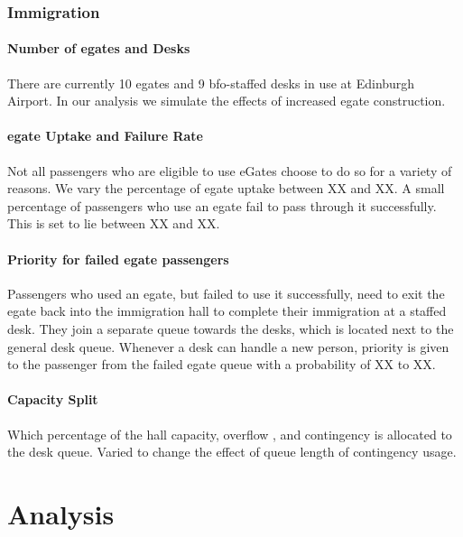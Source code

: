 \documentclass[10pt]{article}
\begin{document}
\subsubsection{Immigration}

\paragraph{Number of \glspl{egate} and Desks} There are currently 10 \glspl{egate} and 9 \gls{bfo}-staffed desks in use at Edinburgh Airport. In our analysis we simulate the effects of increased \gls{egate} construction.

\paragraph{\gls{egate} Uptake and Failure Rate} 
Not all passengers who are eligible to use eGates choose to do so for a variety of reasons. We vary the percentage of \gls{egate} uptake between XX and XX.  A small percentage of passengers who use an \gls{egate} fail to pass through it successfully. This is set to lie between XX and XX. 

\paragraph{Priority for failed \gls{egate} passengers}
Passengers who used an \gls{egate}, but failed to use it successfully, need to exit the \gls{egate} back into the immigration hall to complete their immigration at a staffed desk. They join a separate queue towards the desks, which is located next to the general desk queue. Whenever a desk can handle a new person, priority is given to the passenger from the failed \gls{egate} queue with a probability of XX to XX.

\paragraph{Capacity Split}

Which percentage of the hall capacity, overflow , and contingency is allocated to the desk queue. Varied to change the effect of queue length of contingency usage.



\section{Analysis}
\end{document}
